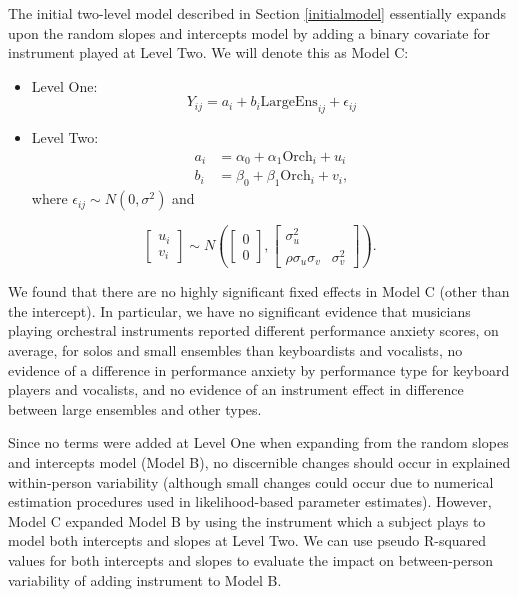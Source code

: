 \documentclass[
]{krantz}
\begin{document}
The initial two-level model described in Section \ref{initialmodel} essentially expands upon the random slopes and intercepts model by adding a binary covariate for instrument played at Level Two. We will denote this as Model C:

\begin{itemize}
\item
  Level One:
  \begin{equation*}
  Y_{ij} = a_{i}+b_{i}\textrm{LargeEns}_{ij}+\epsilon_{ij}
  \end{equation*}
\item
  Level Two:
  \begin{align*}
  a_{i} & = \alpha_{0}+\alpha_{1}\textrm{Orch}_{i}+u_{i} \\
  b_{i} & = \beta_{0}+\beta_{1}\textrm{Orch}_{i}+v_{i},
  \end{align*}
  where \(\epsilon_{ij}\sim N(0,\sigma^2)\) and
\end{itemize}

\[ \left[ \begin{array}{c}
            u_{i} \\ v_{i}
          \end{array}  \right] \sim N \left( \left[
          \begin{array}{c}
            0 \\ 0
          \end{array} \right], \left[
          \begin{array}{cc}
            \sigma_{u}^{2} & \\
            \rho\sigma_{u}\sigma_{v} & \sigma_{v}^{2}
          \end{array} \right] \right). \]

We found that there are no highly significant fixed effects in Model C (other than the intercept). In particular, we have no significant evidence that musicians playing orchestral instruments reported different performance anxiety scores, on average, for solos and small ensembles than keyboardists and vocalists, no evidence of a difference in performance anxiety by performance type for keyboard players and vocalists, and no evidence of an instrument effect in difference between large ensembles and other types.

Since no terms were added at Level One when expanding from the random slopes and intercepts model (Model B), no discernible changes should occur in explained within-person variability (although small changes could occur due to numerical estimation procedures used in likelihood-based parameter estimates). However, Model C expanded Model B by using the instrument which a subject plays to model both intercepts and slopes at Level Two. We can use pseudo R-squared values for both intercepts and slopes to evaluate the impact on between-person variability of adding instrument to Model B.
\end{document}
